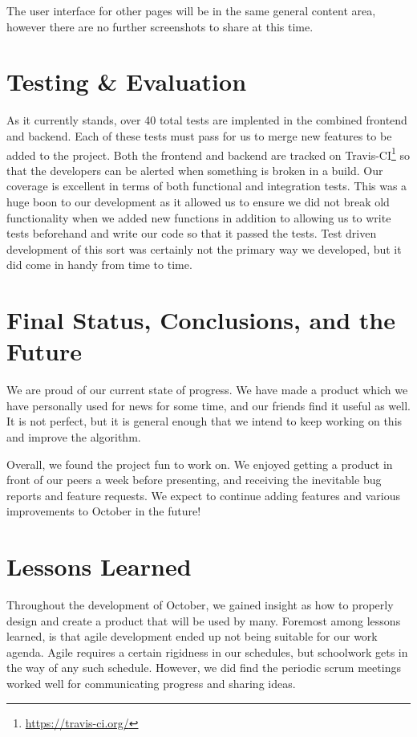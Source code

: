 \documentclass[11pt,letterpaper,titlepage]{article}
\begin{document}
The user interface for other pages will be in the same general content area, however there are no further screenshots to share at this time.

\section{Testing \& Evaluation}
\label{sec:testing}
As it currently stands, over 40 total tests are implented in the combined
frontend and backend.   Each of these tests must pass for us to merge new
features to be added to the project.  Both the frontend and backend are tracked
on Travis-CI\footnote{\url{https://travis-ci.org/}} so that the developers can
be alerted when something is broken in a build.  Our coverage is excellent in
terms of both functional and integration tests.  This was a huge boon to our
development as it allowed us to ensure we did not break old functionality when
we added new functions in addition to allowing us to write tests beforehand and
write our code so that it passed the tests.  Test driven development of this
sort was certainly not the primary way we developed, but it did come in handy
from time to time.

\section{Final Status, Conclusions, and the Future}
\label{sec:progress}
We are proud of our current state of progress.
We have made a product which we have personally used for news for some time, and our friends find it useful as well.
It is not perfect, but it is general enough that we intend to keep working on this and improve the algorithm.

Overall, we found the project fun to work on.
We enjoyed getting a product in front of our peers a week before presenting, and receiving the inevitable bug reports and feature requests.
We expect to continue adding features and various improvements to October in the future!

\section{Lessons Learned}
Throughout the development of October, we gained insight as how to properly design and create a product that will be used by many.
Foremost among lessons learned, is that agile development ended up not being suitable for our work agenda.
Agile requires a certain rigidness in our schedules, but schoolwork gets in the way of any such schedule.
However, we did find the periodic scrum meetings worked well for communicating progress and sharing ideas.
\end{document}
